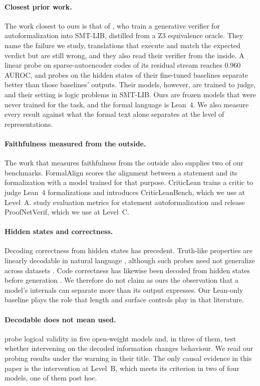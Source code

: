 \documentclass[10pt]{article}
\begin{document}
\paragraph{Closest prior work.}
The work closest to ours is that of \citet{genv}, who train a generative verifier for autoformalization into
SMT-LIB, distilled from a Z3 equivalence oracle. They name the failure we study, translations that execute and
match the expected verdict but are still wrong, and they also read their verifier from the inside. A linear probe
on sparse-autoencoder codes of its residual stream reaches 0.960 AUROC, and probes on the hidden states of their
fine-tuned baselines separate better than those baselines' outputs. Their models, however, are trained to judge,
and their setting is logic problems in SMT-LIB. Ours are frozen models that were never trained for the task, and
the formal language is Lean~4. We also measure every result against what the formal text alone separates at the
level of representations.

\paragraph{Faithfulness measured from the outside.}
The work that measures faithfulness from the outside also supplies two of our benchmarks.
FormalAlign \citep{formalalign} scores the alignment between a statement and its formalization with a model trained
for that purpose. CriticLean \citep{criticlean} trains a critic to judge Lean~4 formalizations and introduces
CriticLeanBench, which we use at Level~A. \citet{proofnetverif} study evaluation metrics for statement
autoformalization and release ProofNetVerif, which we use at Level~C.

\paragraph{Hidden states and correctness.}
Decoding correctness from hidden states has precedent. Truth-like properties are linearly decodable in natural
language \citep{geometry}, although such probes need not generalize across datasets \citep{orgad}. Code correctness
has likewise been decoded from hidden states before generation \citep{dicicco}. We therefore do not claim as ours
the observation that a model's internals can separate more than its output expresses. Our Lean-only baseline plays
the role that length and surface controls play in that literature.

\paragraph{Decodable does not mean used.}
\citet{decodability} probe logical validity in five open-weight models and, in three of them, test
whether intervening on the decoded information changes behaviour. We read our probing results under the warning in their title. The only causal evidence in this paper is the
intervention at Level~B, which meets its criterion in two of four models, one of them post hoc.
\end{document}
